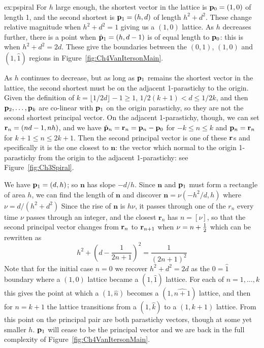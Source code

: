 \begin{jAnswer}{ex:pspiral}
For $h$ large enough, 	the shortest vector in the lattice is  ${\mathbf p}_{0}=(1,0)$ 
of length 1, and the second shortest is  ${\mathbf p}_{1}=(h,d)$ of length $h^2+d^2$.
These change relative magnitude when $h^2+d^2=1$ giving us a $(1,0)$ lattice.
As $h$ decreases further, there is a point when  $\hat{\mathbf p}_{1}=(h,d-1)$ is of equal length to ${\mathbf p}_{0}$: this is when $h^2+d^2=2d$. These give the boundaries between the $(0,1)$, $(1,0)$ and $(1,\hat 1)$ regions in Figure~\ref{fig:Ch4VanItersonMain}. 

As $h$ continues to decrease, but as long as ${\mathbf p}_{1}$ remains the shortest vector in the lattice, the second shortest
must be on the adjacent 1-parastichy to the origin. Given the definition of $k=\lfloor1/2d\rfloor-1\geq 1$, $1/2(k+1)<d\leq 1/2k$,  and then ${\mathbf p}_{2},\ldots,{\mathbf p}_{k}$ are co-linear with ${\mathbf p}_{1}$ on the origin parastichy, so they are not the second shortest principal vector. On the adjacent 1-parastichy, though, we can set $\mathbf{r}_{n}=  (nd-1,n h)$, and we have $\hat{\mathbf p}_{n}=\mathbf{r}_{n}={\mathbf p}_{n}-{\mathbf p}_{0}$ for $-k\leq n\leq k$ and ${\mathbf p}_{n}=\mathbf{r}_{n}$ for $k+1\leq n\leq 2k+1$. Then the second principal vector is one of these $\mathbf{r}_{}$s and specifically it is the one closest to $\mathbf{n}$: the vector which normal to the origin 1-parastichy from the origin to the adjacent 1-parastichy: see Figure~\ref{fig:Ch3Spiral}.
%

We have ${\mathbf p}_{1}=(d,h)$; so $\mathbf{n}$  has slope $-d/h$. Since   $\mathbf{n}$ and ${\mathbf p}_{1}$
must form a rectangle of area $h$, we can find the length of  $\mathbf{n}$ and discover  $\mathbf{n} = \nu (-h^2 /d,h)$
where 
$
	\nu = 
	{d}/{(h^2+d^2)}
$
Since the rise of $\mathbf{n}$ is $h\nu$, it passes through one of the $r_n$ every time $\nu$ passes through an integer,
and the closest  $\mathbf{r}_n$ has $n=[\nu]$, so that the second principal vector changes from $\mathbf{r}_{n}$ to 
$\mathbf{r}_{n+1}$  when $\nu=n+\textstyle{\frac{1}{2}}$ which can be rewritten as 
\begin{equation}
{h^2+\left(d-\frac{1}{2n+1}\right)^2}=  \frac{1}{(2n+1)^2}
\end{equation}
Note that for the initial case $n=0$ we recover $h^2+d^2=2d$ as the $0=\hat{1}$ boundary where a $(1,0)$ lattice became a $(1,\hat 1)$ lattice. For each of $n=1,\ldots,k$ this gives the point at which a  $(1,\hat n)$ becomes a  $(1,\widehat {n+1})$ lattice, and then for $n=k+1$ the lattice transitions from a  $(1,\hat {k})$ to a $(1, {k+1})$ lattice.  From this point on the principal pair are both parastichy vectors, though at some yet smaller $h$.  ${\mathbf p}_{1}$ will cease to be the principal vector and we are back in the full complexity of Figure~\ref{fig:Ch4VanItersonMain}.


\end{jAnswer}
